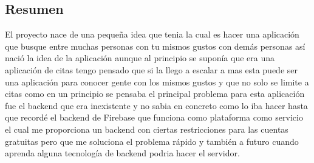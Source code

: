 \subsection{Resumen}
El proyecto nace de una pequeña idea que tenia la cual es hacer una aplicación que busque entre muchas personas con tu mismos gustos con demás personas  así nació la idea de la aplicación aunque al principio se suponía que era una aplicación de citas tengo pensado que si la llego a escalar a mas esta puede ser una aplicación para conocer gente con los mismos gustos y que no solo se limite a citas como en un principio se pensaba el principal problema para esta aplicación fue el backend que era inexistente y no sabia en concreto como lo iba hacer hasta que recordé el backend de Firebase que funciona como plataforma como servicio el cual me proporciona un backend con ciertas restricciones para las cuentas gratuitas pero que me soluciona el problema rápido y también a futuro cuando aprenda alguna tecnología de backend podria hacer el servidor.